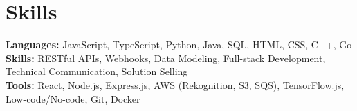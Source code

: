 \documentclass[11pt]{article}       %
\begin{document}
\vspace{-18.5pt}


\section*{Skills}
\textbf{Languages:} JavaScript, TypeScript, Python, Java, SQL, HTML, CSS, C++, Go\\
\textbf{Skills:} RESTful APIs, Webhooks, Data Modeling, Full-stack Development, Technical Communication, Solution Selling\\
\textbf{Tools:} React, Node.js, Express.js, AWS (Rekognition, S3, SQS), TensorFlow.js, Low-code/No-code, Git, Docker\\

\vspace{-6.5pt}
\end{document}

